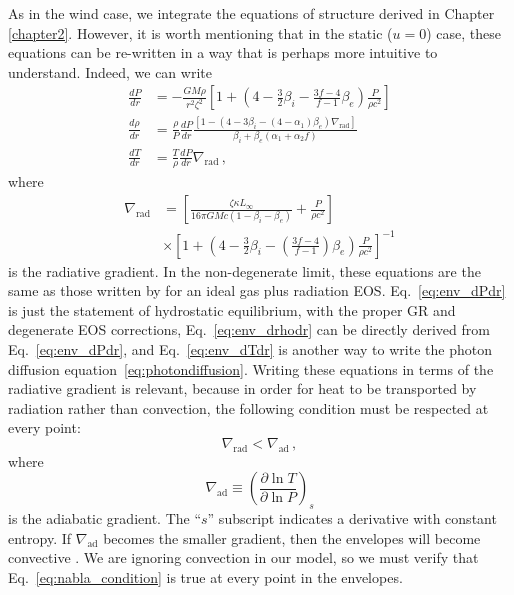 \documentclass[../main.tex]{subfiles}
\begin{document}
As in the wind case, we integrate the equations of structure derived in Chapter \ref{chapter2}. However, it is worth mentioning that in the static ($u=0$) case, these equations can be re-written in a way that is perhaps more intuitive to understand. Indeed, we can write
\begin{align}
    \frac{dP}{dr}&=-\frac{GM\rho}{r^2\zeta^2}\left[1+\left(4-\frac{3}{2}\beta_i-\frac{3f-4}{f-1}\beta_e\right)\frac{P}{\rho c^2}\right] \label{eq:env_dPdr}\\
    \frac{d\rho}{dr}&=\frac{\rho}{P}\frac{dP}{dr}\frac{\left[1-(4-3\beta_i-(4-\alpha_1)\beta_e)\nabla_\text{rad}\right]}{\beta_i+\beta_e(\alpha_1+\alpha_2f)} \label{eq:env_drhodr}\\
    \frac{dT}{dr}&=\frac{T}{\rho}\frac{dP}{dr}\nabla_\text{rad} \label{eq:env_dTdr}\,,
\end{align}
where
\begin{align}
    \label{eq:delrade}
    \nabla_\text{rad}&=\left[\frac{\zeta\kappa L_\infty}{16\pi GMc(1-\beta_i-\beta_e)}+\frac{P}{\rho c^2}\right] \nonumber\\
    &\times \left[1+\left(4-\frac{3}{2}\beta_i-\left(\frac{3f-4}{f-1}\right)\beta_e\right)\frac{P}{\rho c^2}\right]^{-1}
\end{align}
is the radiative gradient. In the non-degenerate limit, these equations are the same as those written by \citet{Paczynski1986a} for an ideal gas plus radiation EOS. Eq.~\ref{eq:env_dPdr} is just the statement of hydrostatic equilibrium, with the proper GR and degenerate EOS corrections, Eq.~\eqref{eq:env_drhodr} can be directly derived from Eq.~\eqref{eq:env_dPdr}, and Eq.~\ref{eq:env_dTdr} is another way to write the photon diffusion equation~\eqref{eq:photondiffusion}.  Writing these equations in terms of the radiative gradient is relevant, because in order for heat to be transported by radiation rather than convection, the following condition must be respected at every point:
\begin{equation}\label{eq:nabla_condition}
    \nabla_\text{rad}<\nabla_\text{ad}\,,
\end{equation}
where
\begin{equation}
    \nabla_\text{ad}\equiv\left(\frac{\partial\ln T}{\partial\ln P}\right)_s
\end{equation}
is the adiabatic gradient. The ``$s$'' subscript indicates a derivative with constant entropy. If $\nabla_\text{ad}$ becomes the smaller gradient, then the envelopes will become convective \citep{Paczynski1986a}. We are ignoring convection in our model, so we must verify that Eq.~\eqref{eq:nabla_condition} is true at every point in the envelopes.
\end{document}
